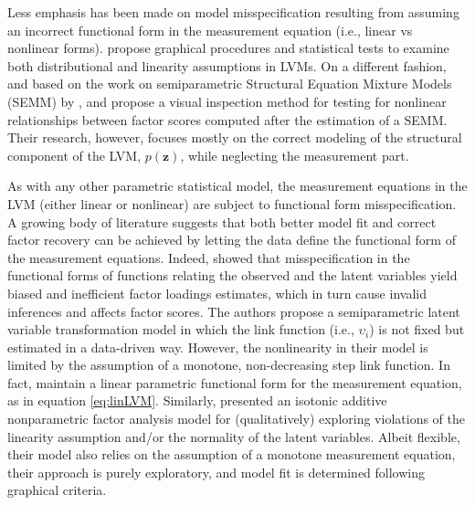 \documentclass[11pt, a4paper]{article}
\begin{document}
Less emphasis has been made on model misspecification resulting from assuming an incorrect functional form in the measurement equation (i.e., linear vs nonlinear forms). \citet{SanchezEtAl_Biometrics2009} propose graphical procedures and statistical tests to examine both distributional and linearity assumptions in LVMs. On a different fashion, and based on the work on semiparametric Structural Equation Mixture Models (SEMM) by \citet{Bauer_SEM2005}, \citet{BauerEtAl_SEM2012, Pek&Chalmers_SEM2015} and \cite{PekEtAl_JEBS2015} propose a visual inspection method for testing for nonlinear relationships between factor scores computed after the estimation of a SEMM. Their research, however, focuses mostly on the correct modeling of the structural component of the LVM, $p(\mathbf{z})$, while neglecting the measurement part. 

As with any other parametric statistical model, the measurement equations in the LVM (either linear or nonlinear) are subject to functional form misspecification. A growing body of literature suggests that both better model fit and correct factor recovery can be achieved by letting the data define the functional form of the measurement equations. Indeed, \citet{LinEtAl_StatSin2014} showed that misspecification in the functional forms of functions relating the observed and the latent variables yield biased and inefficient factor loadings estimates, which in turn cause invalid inferences and affects factor scores. The authors propose a semiparametric latent variable transformation model in which the link function (i.e., $\upsilon_i$) is not fixed but estimated in a data-driven way. However, the nonlinearity in their model is limited by the assumption of a monotone, non-decreasing step link function. In fact, \citeauthor{LinEtAl_StatSin2014} maintain a linear parametric functional form for the measurement equation, as in equation \eqref{eq:linLVM}. Similarly, \citet{Sardy&Victoria-Feser_StatComput2012} presented an isotonic additive nonparametric factor analysis model for (qualitatively) exploring violations of the linearity assumption and/or the normality of the latent variables. Albeit flexible, their model also relies on the assumption of a monotone measurement equation, their approach is purely exploratory, and model fit is determined following graphical criteria.

\end{document}

